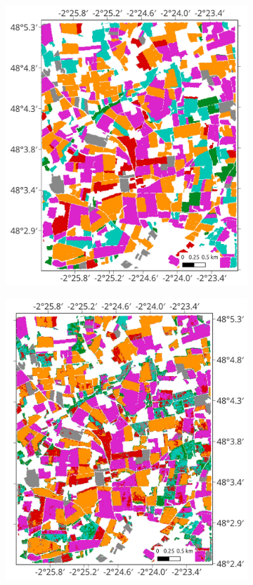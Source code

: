 \documentclass[journal,article,submit,pdftex,moreauthors]{Definitions/mdpi}
\begin{document}
\begin{figure}[H]
	\begin{subfigure}[t]{0.35\linewidth}
	\includegraphics[height=\linewidth,width=\textwidth]{round2_remote_sensing_Andrea_Gonzalez/figures/classification_maps/test_aoi_gt.pdf}
	\caption{}
	\label{fig:test_aoi_gt}
	\end{subfigure}%
	\begin{subfigure}[t]{0.35\linewidth}
	  \includegraphics[height=\linewidth,width=\textwidth]{round2_remote_sensing_Andrea_Gonzalez/figures/classification_maps/test_aoi_pixel-wise.pdf}

\end{subfigure}
\end{figure}
\end{document}
